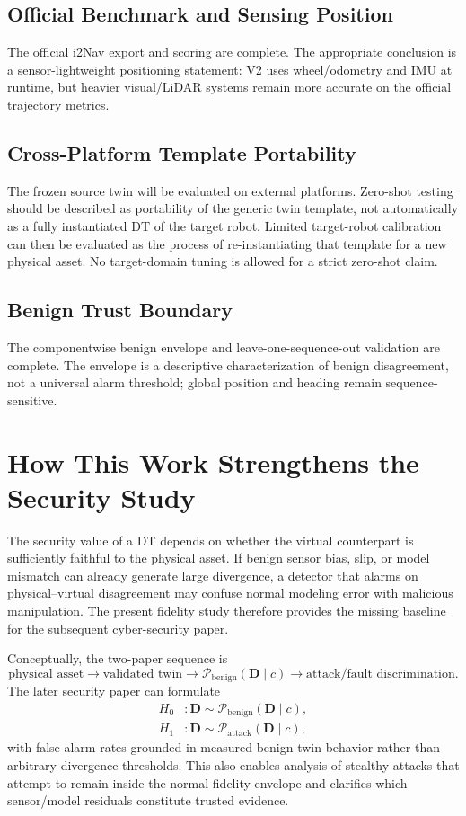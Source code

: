 \documentclass[conference]{IEEEtran}
\begin{document}
\subsection{Official Benchmark and Sensing Position}
The official i2Nav export and scoring are complete. The appropriate conclusion is a sensor-lightweight positioning statement: V2 uses wheel/odometry and IMU at runtime, but heavier visual/LiDAR systems remain more accurate on the official trajectory metrics.

\subsection{Cross-Platform Template Portability}
The frozen source twin will be evaluated on external platforms. Zero-shot testing should be described as portability of the generic twin template, not automatically as a fully instantiated DT of the target robot. Limited target-robot calibration can then be evaluated as the process of re-instantiating that template for a new physical asset. No target-domain tuning is allowed for a strict zero-shot claim.

\subsection{Benign Trust Boundary}
The componentwise benign envelope and leave-one-sequence-out validation are complete. The envelope is a descriptive characterization of benign disagreement, not a universal alarm threshold; global position and heading remain sequence-sensitive.

\section{How This Work Strengthens the Security Study}
The security value of a DT depends on whether the virtual counterpart is sufficiently faithful to the physical asset. If benign sensor bias, slip, or model mismatch can already generate large divergence, a detector that alarms on physical--virtual disagreement may confuse normal modeling error with malicious manipulation. The present fidelity study therefore provides the missing baseline for the subsequent cyber-security paper.

Conceptually, the two-paper sequence is
\begin{equation}
\text{physical asset}
\rightarrow \text{validated twin}
\rightarrow \mathcal{P}_{\mathrm{benign}}(\mathbf{D}\mid c)
\rightarrow \text{attack/fault discrimination}.
\end{equation}
The later security paper can formulate
\begin{align}
H_0 &: \mathbf{D} \sim \mathcal{P}_{\mathrm{benign}}(\mathbf{D}\mid c),\\
H_1 &: \mathbf{D} \sim \mathcal{P}_{\mathrm{attack}}(\mathbf{D}\mid c),
\end{align}
with false-alarm rates grounded in measured benign twin behavior rather than arbitrary divergence thresholds. This also enables analysis of stealthy attacks that attempt to remain inside the normal fidelity envelope and clarifies which sensor/model residuals constitute trusted evidence.
\end{document}
